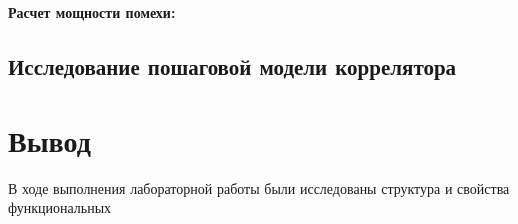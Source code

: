 \textbf{Расчет мощности помехи:}\\

\subsection{Исследование пошаговой модели коррелятора}


\section{Вывод}
В ходе выполнения лабораторной работы были исследованы структура и свойства функциональных